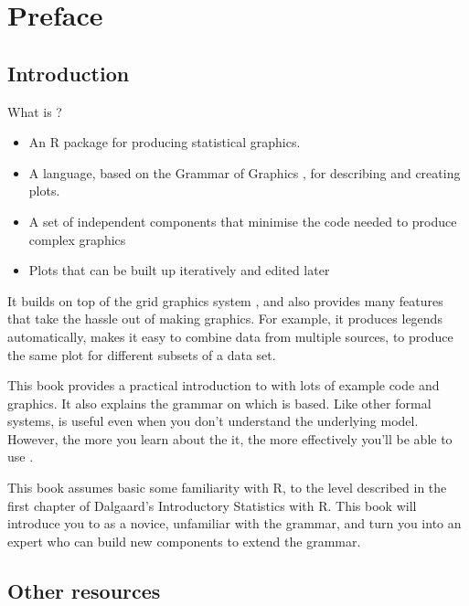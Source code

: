 

\chapter{Preface}

\section{Introduction}

What is \ggplot? 

\begin{itemize}
  \item An R package for producing statistical graphics.  

  \item A language, based on the Grammar of Graphics \citep{wilkinson:2006},  for describing and creating plots. 

  \item A set of independent components that minimise the code needed to produce complex graphics

  \item Plots that can be built up iteratively and edited later

\end{itemize} 

It builds on top of the grid graphics system \citep{grid}, and also provides many features that take the hassle out of making graphics. For example, it produces legends automatically, makes it easy to combine data from multiple sources, to produce the same plot for different subsets of a data set.

This book provides a practical introduction to \ggplot with lots of example code and graphics. It also explains the grammar on which \ggplot is based. Like other formal systems, \ggplot is useful even when you don't understand the underlying model. However, the more you learn about the it, the more effectively you'll be able to use \ggplot. 

This book assumes basic some familiarity with R, to the level described in the first chapter of Dalgaard’s Introductory Statistics with R. This book will introduce you to \ggplot as a novice, unfamiliar with the grammar, and turn you into an expert who can build new components to extend the grammar.

\section{Other resources}
\label{sec:other_resources}

